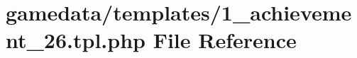 \hypertarget{1__achievement__26_8tpl_8php}{\section{gamedata/templates/1\+\_\+achievement\+\_\+26.tpl.\+php File Reference}
\label{1__achievement__26_8tpl_8php}
}
